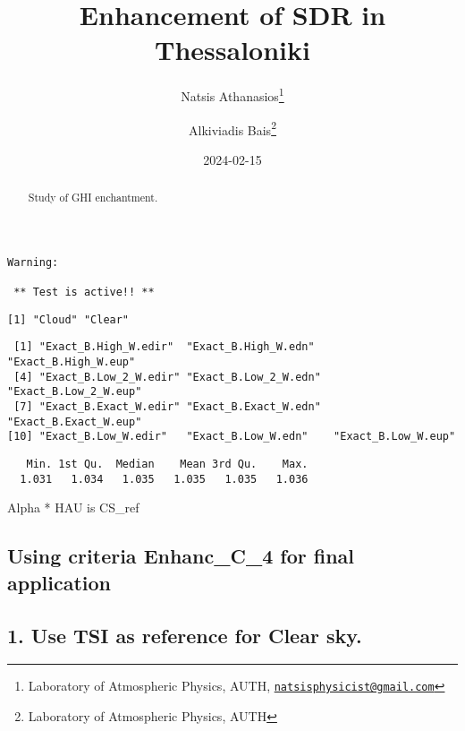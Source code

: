 \documentclass[
  10pt,
  a4paper,oneside]{article}
\title{Enhancement of SDR in Thessaloniki}
\author{Natsis Athanasios\footnote{Laboratory of Atmospheric Physics, AUTH, \href{mailto:natsisphysicist@gmail.com}{\nolinkurl{natsisphysicist@gmail.com}}} \and Alkiviadis Bais\footnote{Laboratory of Atmospheric Physics, AUTH}}
\date{2024-02-15}
\begin{document}
\maketitle
\begin{abstract}
Study of GHI enchantment.
\end{abstract}

{
\hypersetup{linkcolor=}
\setcounter{tocdepth}{4}
\tableofcontents
}
\begin{verbatim}
Warning: 

 ** Test is active!! ** 
\end{verbatim}

\begin{verbatim}
[1] "Cloud" "Clear"
\end{verbatim}

\begin{verbatim}
 [1] "Exact_B.High_W.edir"  "Exact_B.High_W.edn"   "Exact_B.High_W.eup"  
 [4] "Exact_B.Low_2_W.edir" "Exact_B.Low_2_W.edn"  "Exact_B.Low_2_W.eup" 
 [7] "Exact_B.Exact_W.edir" "Exact_B.Exact_W.edn"  "Exact_B.Exact_W.eup" 
[10] "Exact_B.Low_W.edir"   "Exact_B.Low_W.edn"    "Exact_B.Low_W.eup"   
\end{verbatim}

\begin{verbatim}
   Min. 1st Qu.  Median    Mean 3rd Qu.    Max. 
  1.031   1.034   1.035   1.035   1.035   1.036 
\end{verbatim}

Alpha * HAU is CS\_ref

\hypertarget{using-criteria-enhanc_c_4-for-final-application}{%
\subsection{\texorpdfstring{Using criteria \textbf{Enhanc\_C\_4} for final application}{Using criteria Enhanc\_C\_4 for final application}}\label{using-criteria-enhanc_c_4-for-final-application}}

\hypertarget{use-tsi-as-reference-for-clear-sky.}{%
\subsection{1. Use TSI as reference for Clear sky.}\label{use-tsi-as-reference-for-clear-sky.}}
\end{document}
